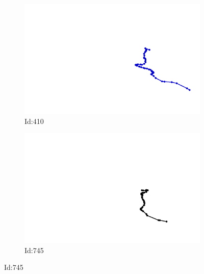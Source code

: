 \documentclass[12pt,twoside]{report}
\begin{document}
\begin{figure}
\centering
\begin{subfigure}[b]{0.20\textwidth}
\centering
\includegraphics[width=\textwidth]{../../trajectories/410.png}
\caption{Id:410}
\end{subfigure}
\begin{subfigure}[b]{0.20\textwidth}
\centering
\includegraphics[width=\textwidth]{../../trajectories/745.png}
\caption{Id:745}
\end{subfigure}
\end{figure}
\end{document}

